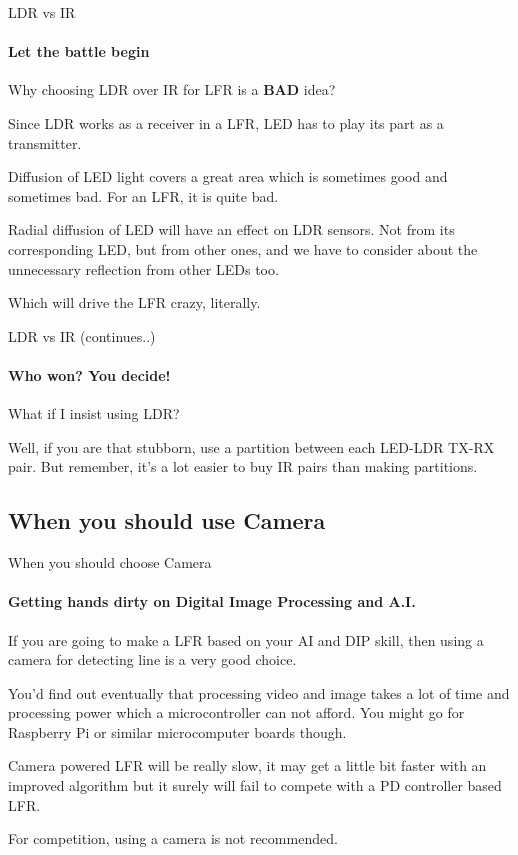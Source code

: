 \documentclass{beamer}
\begin{document}
	\begin{frame}{LDR vs IR}
	\framesubtitle{Let the battle begin}
	
	\begin{alertblock}{Why choosing LDR over IR for LFR is a \textbf{BAD} idea?}
	
	Since LDR works as a receiver in a LFR, LED has to play its part as a transmitter. 
	
	\bigskip
	
	Diffusion of LED light covers a great area which is sometimes good and sometimes bad. For an LFR, it is quite bad. 
	
	\bigskip
	
	
	Radial diffusion of LED will have an effect on LDR sensors. Not from its corresponding LED, but from other ones, and we have to consider about the unnecessary reflection from other LEDs too.
	
	\bigskip
	
	Which will drive the LFR crazy, literally.
	
	\end{alertblock}
	
	\end{frame}
	
	
	
	\begin{frame}{LDR vs IR (continues..)}
	\framesubtitle{Who won? You decide!}
	
	\begin{alertblock}{What if I insist using LDR?}
	
	Well, if you are that stubborn, use a  partition between each LED-LDR TX-RX pair. But remember, it's a lot easier to buy IR pairs than making partitions.
	
	\end{alertblock}
	
	\end{frame}
	
	\subsection{When you should use Camera}
		
	\begin{frame} {When you should choose Camera}
	\framesubtitle{Getting hands dirty on Digital Image Processing and A.I.}
		
	If you are going to make a LFR based on your AI and DIP skill, then using a camera for detecting line is a very good choice.
	
	\bigskip 
	
	You'd find out eventually that processing video and image takes a lot of time and processing power which a microcontroller can not afford. You might go for Raspberry Pi or similar microcomputer boards though.
	
	\bigskip 
	
	Camera powered LFR will be really slow, it may get a little bit faster with an improved algorithm but it surely will fail to compete with a PD controller based LFR. 
	
	\alert{For competition, using a camera is not recommended.}
	
	\end{frame}
	
\end{document}

